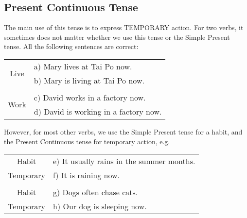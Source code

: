 \subsection{Present Continuous Tense}
The main use of this tense is to express TEMPORARY action.
For two verbs, it sometimes does not matter whether we use this tense or the
Simple Present tense.
All the following sentences are correct:
\begin{center}
\begin{tabular}{|cl|}
    \hline
    \multirow{2}{*}{Live} & a) Mary lives at Tai Po now. \\
                          & b) Mary is living at Tai Po now. \\ 
                          & \\
    \multirow{2}{*}{Work} & c) David works in a factory now. \\
                          & d) David is working in a factory now. \\ \hline
\end{tabular}
\end{center}

However, for most other verbs, we use the Simple Present tense for a habit,
and the Present Continuous tense for temporary action, e.g.
\begin{center}
\begin{tabular}{|cl|}
    \hline
    Habit     & e) It usually rains in the summer months. \\
    Temporary & f) It is raining now. \\
              & \\
    Habit     & g) Dogs often chase cats. \\
    Temporary & h) Our dog is sleeping now. \\ \hline
\end{tabular}
\end{center}

